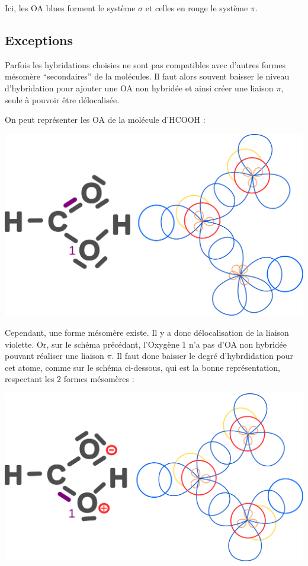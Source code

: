 \documentclass[french]{yLectureNote}
\begin{document}
Ici, les OA blues forment le système $\sigma$ et celles en rouge le système $\pi$.
\subsection{Exceptions}
Parfois les hybridations choisies ne sont pas compatibles avec d'autres formes mésomère ``secondaires'' de la molécules. Il faut alors souvent baisser le niveau d'hybridation pour ajouter une OA non hybridée et ainsi créer une liaison $\pi$, seule à pouvoir \^etre délocalisée.

On peut représenter les OA de la molécule d'HCOOH :

\includegraphics[scale=0.25]{form_1}

Cependant, une forme mésomère existe. Il y a donc délocalisation de la liaison violette. Or, sur le schéma précédant, l'Oxygène 1 n'a pas d'OA non hybridée pouvant réaliser une liaison $\pi$. Il faut donc baisser le degré d'hybrdidation pour cet atome, comme sur le schéma ci-dessous, qui est la bonne représentation, respectant les 2 formes mésomères :

\includegraphics[scale=0.25]{form_2}
\end{document}
